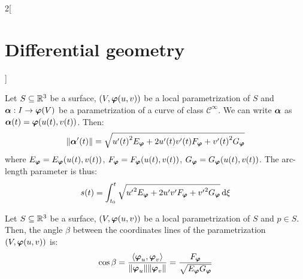 \documentclass[../../../main.tex]{subfiles}
\begin{document}
\begin{multicols}{2}[\section{Differential geometry}]
\begin{definition}
  \end{definition}
  \begin{proposition}
    Let $S\subseteq\mathbb{R}^3$ be a surface, $(V,\boldsymbol{\mathrm{\varphi}}(u,v))$ be a local parametrization of $S$ and $\boldsymbol{\mathrm{\alpha}}:I\rightarrow\boldsymbol{\mathrm{\varphi}}(V)$ be a parametrization of a curve of class $\mathcal{C}^\infty$. We can write $\boldsymbol{\mathrm{\alpha}}$ as $\boldsymbol{\mathrm{\alpha}}(t)=\boldsymbol{\mathrm{\varphi}}(u(t),v(t))$. Then:
    $$\|\boldsymbol{\mathrm{\alpha}}'(t)\|=\sqrt{{u'(t)}^2 E_{\boldsymbol{\mathrm{\varphi}}}+2u'(t)v'(t) F_{\boldsymbol{\mathrm{\varphi}}}+{v'(t)}^2G_{\boldsymbol{\mathrm{\varphi}}}}$$ where $E_{\boldsymbol{\mathrm{\varphi}}}=E_{\boldsymbol{\mathrm{\varphi}}}(u(t),v(t))$, $F_{\boldsymbol{\mathrm{\varphi}}}=F_{\boldsymbol{\mathrm{\varphi}}}(u(t),v(t))$, $G_{\boldsymbol{\mathrm{\varphi}}}=G_{\boldsymbol{\mathrm{\varphi}}}(u(t),v(t))$. The arc-length parameter is thus:
    $$s(t)=\int_{t_0}^t\sqrt{{u'}^2 E_{\boldsymbol{\mathrm{\varphi}}}+2u'v' F_{\boldsymbol{\mathrm{\varphi}}}+{v'}^2G_{\boldsymbol{\mathrm{\varphi}}}}\dd{\xi}$$
  \end{proposition}
  \begin{proposition}
    Let $S\subseteq\mathbb{R}^3$ be a surface, $(V,\boldsymbol{\mathrm{\varphi}}(u,v))$ be a local parametrization of $S$ and $p\in S$. Then, the angle $\beta$ between the coordinates lines of the parametrization $(V,\boldsymbol{\mathrm{\varphi}}(u,v))$ is: $$\cos\beta=\frac{\langle\boldsymbol{\mathrm{\varphi}}_u,\boldsymbol{\mathrm{\varphi}}_v\rangle}{\|\boldsymbol{\mathrm{\varphi}}_u\|\|\boldsymbol{\mathrm{\varphi}}_v\|}=\frac{F_{\boldsymbol{\mathrm{\varphi}}}}{\sqrt{E_{\boldsymbol{\mathrm{\varphi}}}G_{\boldsymbol{\mathrm{\varphi}}}}}$$
  \end{proposition}

\end{multicols}
\end{document}
